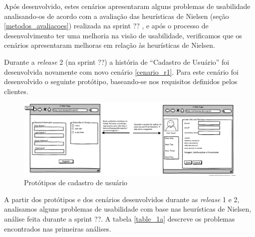 Após desenvolvido, estes cenários apresentaram alguns problemas de usabilidade analisando-os de acordo com a avaliação das heurísticas de Nielsen (seção \ref{metodos_avaliacoes}) realizada na sprint ?? , e após o processo de desenvolvimento ter uma melhoria na visão de usabilidade, verificamos que os cenários apresentaram melhoras em relação às heurísticas de Nielsen. 

Durante a \textit{release} 2 (na sprint ??) a história de ``Cadastro de Usuário'' foi desenvolvida novamente com novo cenário \ref{cenario_r1}. Para este cenário foi desenvolvido o seguinte protótipo, baseando-se nos requisitos definidos pelos clientes. 

	\begin{figure}[h!]
    	\centering
    	\includegraphics[keepaspectratio=true,scale=0.3]
      		{figuras/CadastroEdicaoUser.eps}
    	\caption{Protótipos de cadastro de usuário}
    	\label{cadastro user}
	\end{figure}

A partir dos protótipos e dos cenários desenvolvidos durante as \textit{release} 1 e 2, analisamos alguns problemas de usabilidade com base nas heurísticas de Nielsen, análise feita durante a sprint ??. A tabela \ref{table_1a} descreve os problemas encontrados nas primeiras análises.

